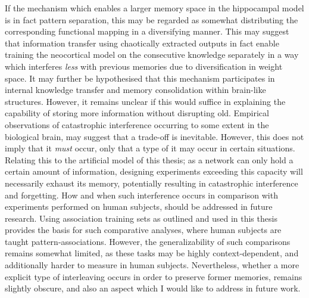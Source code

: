 If the mechanism which enables a larger memory space in the hippocampal model is in fact pattern separation, this may be regarded as somewhat distributing the corresponding functional mapping in a diversifying manner. This may suggest that information transfer using chaotically extracted outputs in fact enable training the neocortical model on the consecutive knowledge separately in a way which interferes \textit{less} with previous memories due to diversification in weight space.
It may further be hypothesised that this mechanism participates in internal knowledge transfer and memory consolidation within brain-like structures. However, it remains unclear if this would suffice in explaining the capability of storing more information without disrupting old. Empirical observations of catastrophic interference occurring to some extent in the biological brain, may suggest that a trade-off is inevitable. However, this does not imply that it \textit{must} occur, only that a type of it may occur in certain situations. Relating this to the artificial model of this thesis; as a network can only hold a certain amount of information, designing experiments exceeding this capacity will necessarily exhaust its memory, potentially resulting in catastrophic interference and forgetting. How and when such interference occurs in comparison with experiments performed on human subjects, should be addressed in future research. Using association training sets as outlined and used in this thesis provides the basis for such comparative analyses, where human subjects are taught pattern-associations. However, the generalizability of such comparisons remains somewhat limited, as these tasks may be highly context-dependent, and additionally harder to measure in human subjects.
Nevertheless, whether a more explicit type of interleaving occurs in order to preserve former memories, remains slightly obscure, and also an aspect which I would like to address in future work.
\\


